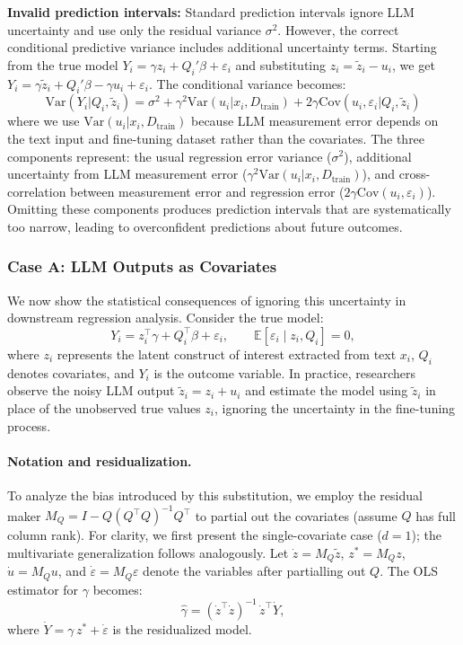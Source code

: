 \documentclass[11pt]{article}
\begin{document}
\textbf{Invalid prediction intervals:} 
Standard prediction intervals ignore LLM uncertainty and use only the residual variance $\sigma^2$. 
However, the correct conditional predictive variance includes additional uncertainty terms. 
Starting from the true model $Y_i = \gamma z_i + Q_i'\beta + \varepsilon_i$ and substituting $z_i = \tilde{z}_i - u_i$, 
we get $Y_i = \gamma\tilde{z}_i + Q_i'\beta - \gamma u_i + \varepsilon_i$. The conditional variance becomes:
\begin{equation}
\text{Var}(Y_i | Q_i, \tilde{z}_i) = \sigma^2 + \gamma^2\text{Var}(u_i | x_i, D_{\text{train}}) + 2\gamma \text{Cov}(u_i, \varepsilon_i | Q_i, \tilde{z}_i) \tag{A3}
\end{equation}
where we use $\text{Var}(u_i | x_i, D_{\text{train}})$ because LLM measurement error depends on the text input and fine-tuning dataset rather than the covariates. 
The three components represent: the usual regression error variance ($\sigma^2$), 
additional uncertainty from LLM measurement error ($\gamma^2\text{Var}(u_i | x_i, D_{\text{train}})$), 
and cross-correlation between measurement error and regression error ($2\gamma \text{Cov}(u_i, \varepsilon_i)$). 
Omitting these components produces prediction intervals that are systematically too narrow, 
leading to overconfident predictions about future outcomes.


\subsubsection{Case A: LLM Outputs as Covariates}

We now show the statistical consequences of ignoring this uncertainty in downstream regression analysis.
Consider the true model:
\begin{equation}
Y_i = z_i^\top\gamma + Q_i^\top\beta + \varepsilon_i,\qquad \mathbb{E}[\varepsilon_i \mid z_i,Q_i]=0,
\end{equation}
where $z_i$ represents the latent construct of interest extracted from text $x_i$, $Q_i$ denotes covariates, and $Y_i$ is the outcome variable.
In practice, researchers observe the noisy LLM output $\tilde z_i = z_i + u_i$ and estimate the model using $\tilde z_i$ in place of the unobserved true values $z_i$, ignoring the uncertainty in the fine-tuning process.

\paragraph{Notation and residualization.}
To analyze the bias introduced by this substitution, we employ the residual maker $M_Q = I - Q(Q^\top Q)^{-1}Q^\top$ to partial out the covariates (assume $Q$ has full column rank).
For clarity, we first present the single-covariate case ($d=1$); the multivariate generalization follows analogously.
Let $\dot z = M_Q \tilde z$, $z^\ast = M_Q z$, $\dot u = M_Q u$, and $\dot\varepsilon = M_Q \varepsilon$ denote the variables after partialling out $Q$.
The OLS estimator for $\gamma$ becomes:
\begin{equation}
\hat\gamma = (\dot z^\top \dot z)^{-1}\, \dot z^\top \dot Y,
\end{equation}
where $\dot Y = \gamma\, z^\ast + \dot\varepsilon$ is the residualized model.
\end{document}

